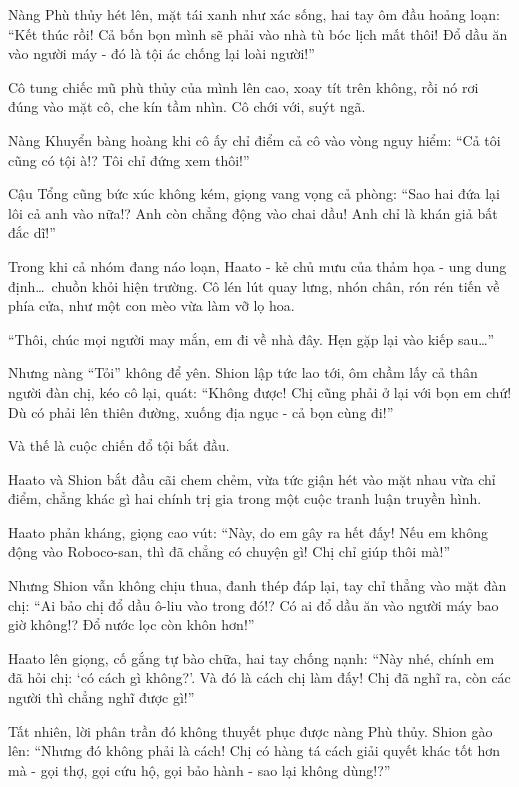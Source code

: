 \documentclass[../main.tex]{subfiles}
\begin{document}
Nàng Phù thủy hét lên, mặt tái xanh như xác sống, hai tay ôm đầu hoảng loạn: ``Kết thúc rồi! Cả bốn bọn mình sẽ phải vào nhà tù bóc lịch mất thôi! Đổ dầu ăn vào người máy - đó là tội ác chống lại loài người!''

Cô tung chiếc mũ phù thủy của mình lên cao, xoay tít trên không, rồi nó rơi đúng vào mặt cô, che kín tầm nhìn. Cô chới với, suýt ngã.

Nàng Khuyển bàng hoàng khi cô ấy chỉ điểm cả cô vào vòng nguy hiểm: ``Cả tôi cũng có tội à!? Tôi chỉ đứng xem thôi!''

Cậu Tổng cũng bức xúc không kém, giọng vang vọng cả phòng: ``Sao hai đứa lại lôi cả anh vào nữa!? Anh còn chẳng động vào chai dầu! Anh chỉ là khán giả bất đắc dĩ!''


Trong khi cả nhóm đang náo loạn, Haato - kẻ chủ mưu của thảm họa - ung dung định\dots\ chuồn khỏi hiện trường. Cô lén lút quay lưng, nhón chân, rón rén tiến về phía cửa, như một con mèo vừa làm vỡ lọ hoa.

``Thôi, chúc mọi người may mắn, em đi về nhà đây. Hẹn gặp lại vào kiếp sau\dots''

Nhưng nàng ``Tỏi'' không để yên. Shion lập tức lao tới, ôm chầm lấy cả thân người đàn chị, kéo cô lại, quát: ``Không được! Chị cũng phải ở lại với bọn em chứ! Dù có phải lên thiên đường, xuống địa ngục - cả bọn cùng đi!''


Và thế là cuộc chiến đổ tội bắt đầu.

Haato và Shion bắt đầu cãi chem chẻm, vừa tức giận hét vào mặt nhau vừa chỉ điểm, chẳng khác gì hai chính trị gia trong một cuộc tranh luận truyền hình.

Haato phản kháng, giọng cao vút: ``Này, do em gây ra hết đấy! Nếu em không động vào Roboco-san, thì đã chẳng có chuyện gì! Chị chỉ giúp thôi mà!''

Nhưng Shion vẫn không chịu thua, đanh thép đáp lại, tay chỉ thẳng vào mặt đàn chị: ``Ai bảo chị đổ dầu ô-liu vào trong đó!? Có ai đổ dầu ăn vào người máy bao giờ không!? Đổ nước lọc còn khôn hơn!''

Haato lên giọng, cố gắng tự bào chữa, hai tay chống nạnh: ``Này nhé, chính em đã hỏi chị: `có cách gì không?'. Và đó là cách chị làm đấy! Chị đã nghĩ ra, còn các người thì chẳng nghĩ được gì!''

Tất nhiên, lời phân trần đó không thuyết phục được nàng Phù thủy. Shion gào lên: ``Nhưng đó không phải là cách! Chị có hàng tá cách giải quyết khác tốt hơn mà - gọi thợ, gọi cứu hộ, gọi bảo hành - sao lại không dùng!?''
\end{document}
